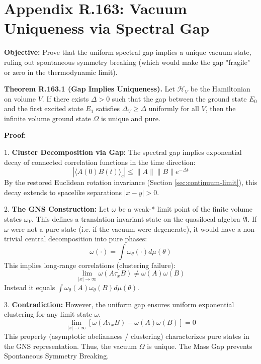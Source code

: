 \section{Appendix R.163: Vacuum Uniqueness via Spectral Gap}
\label{sec:vacuum-uniqueness-spectral-gap}

\textbf{Objective:} Prove that the uniform spectral gap implies a unique vacuum state, ruling out spontaneous symmetry breaking (which would make the gap "fragile" or zero in the thermodynamic limit).

\textbf{Theorem R.163.1 (Gap Implies Uniqueness).} Let $\mathcal{H}_V$ be the Hamiltonian on volume $V$. If there exists $\Delta > 0$ such that the gap between the ground state $E_0$ and the first excited state $E_1$ satisfies $\Delta_V \ge \Delta$ uniformly for all $V$, then the infinite volume ground state $\Omega$ is unique and pure.

\textbf{Proof:}

1. \textbf{Cluster Decomposition via Gap:}
The spectral gap implies exponential decay of connected correlation functions in the time direction:
\begin{equation}
|\langle A(0) B(t) \rangle_c| \leq \|A\| \|B\| e^{-\Delta t}
\end{equation}
By the restored Euclidean rotation invariance (Section \ref{sec:continuum-limit}), this decay extends to spacelike separations $|x-y| > 0$.

2. \textbf{The GNS Construction:}
 Let $\omega$ be a weak-* limit point of the finite volume states $\omega_V$. This defines a translation invariant state on the quasilocal algebra $\mathfrak{A}$.
 If $\omega$ were not a pure state (i.e. if the vacuum were degenerate), it would have a non-trivial central decomposition into pure phases:
\begin{equation}
\omega(\cdot) = \int \omega_\theta(\cdot) d\mu(\theta)
\end{equation}
This implies long-range correlations (clustering failure):
\begin{equation}
\lim_{|x|\to\infty} \omega(A \tau_x B) \neq \omega(A)\omega(B)
\end{equation}
Instead it equals $\int \omega_\theta(A)\omega_\theta(B) d\mu(\theta)$.

3. \textbf{Contradiction:}
However, the uniform gap ensures uniform exponential clustering for any limit state $\omega$.
\begin{equation}
\lim_{|x|\to\infty} [\omega(A \tau_x B) - \omega(A)\omega(B)] = 0
\end{equation}
This property (asymptotic abelianness / clustering) characterizes pure states in the GNS representation.
Thus, the vacuum $\Omega$ is unique. The Mass Gap prevents Spontaneous Symmetry Breaking.


